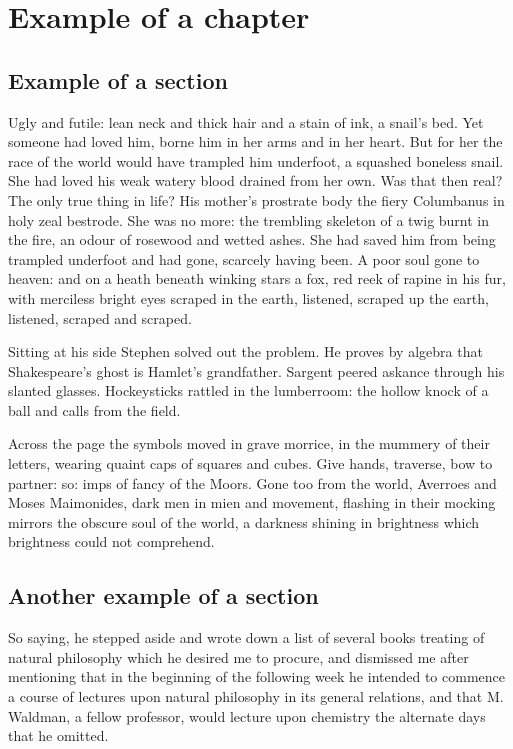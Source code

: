 \chapter{Example of a chapter}\label{ch:example}
  
\section{Example of a section}\label{sec:first_example}
  
Ugly and futile: lean neck and thick hair and a stain of ink, a snail's
bed. Yet someone had loved him, borne him in her arms and in her heart.
But for her the race of the world would have trampled him underfoot,
a squashed boneless snail. She had loved his weak watery blood drained
from her own. Was that then real? The only true thing in life? His
mother's prostrate body the fiery Columbanus in holy zeal bestrode.
She was no more: the trembling skeleton of a twig burnt in the fire,
an odour of rosewood and wetted ashes. She had saved him from being
trampled underfoot and had gone, scarcely having been. A poor soul
gone to heaven: and on a heath beneath winking stars a fox, red reek
of rapine in his fur, with merciless bright eyes scraped in the earth,
listened, scraped up the earth, listened, scraped and scraped.

Sitting at his side Stephen solved out the problem. He proves by algebra
that Shakespeare's ghost is Hamlet's grandfather. Sargent peered askance
through his slanted glasses. Hockeysticks rattled in the lumberroom: the
hollow knock of a ball and calls from the field.

Across the page the symbols moved in grave morrice, in the mummery of
their letters, wearing quaint caps of squares and cubes. Give hands,
traverse, bow to partner: so: imps of fancy of the Moors. Gone too from
the world, Averroes and Moses Maimonides, dark men in mien and movement,
flashing in their mocking mirrors the obscure soul of the world, a
darkness shining in brightness which brightness could not comprehend.
  
\section{Another example of a section}\label{sec:second_example}

So saying, he stepped aside and wrote down a list of several books
treating of natural philosophy which he desired me to procure, and
dismissed me after mentioning that in the beginning of the following
week he intended to commence a course of lectures upon natural
philosophy in its general relations, and that M. Waldman, a fellow
professor, would lecture upon chemistry the alternate days that he
omitted.

